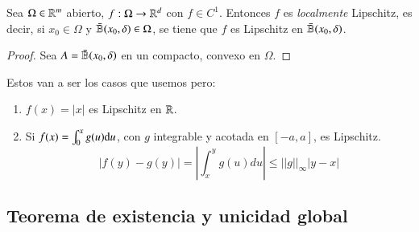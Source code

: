 \begin{cor}
    Sea $\Omega \in \mathbb{R}^m$ abierto, $f: \Omega \to \mathbb{R}^d$ con $f \in C^1$. Entonces $f$ es \textit{localmente} Lipschitz, es decir, si $x_0 \in \Omega$ y $\bar{\mathbb{B}}(x_0, \delta) \in \Omega$, se tiene que $f$ es Lipschitz en $\bar{\mathbb{B}}(x_0, \delta)$.
\end{cor}
\begin{proof}
    Sea $A = \bar{\mathbb{B}}(x_0, \delta)$ en un compacto, convexo en $\Omega$.
\end{proof}
\begin{obs}
    Estos van a ser los casos que usemos pero:
    \begin{enumerate}
        \item $f(x) = |x|$ es Lipschitz en $\mathbb{R}$.
        \item Si $f(x) = \int_0^x g(u) \mathrm{d} u$, con $g$ integrable y acotada en $[-a, a]$, es Lipschitz.
        $$
            |f(y)-g(y)| = \left|\int_x^y g(u) du\right| \leq ||g||_\infty |y-x|
        $$
    \end{enumerate}
\end{obs}
\subsection{Teorema de existencia y unicidad global}

